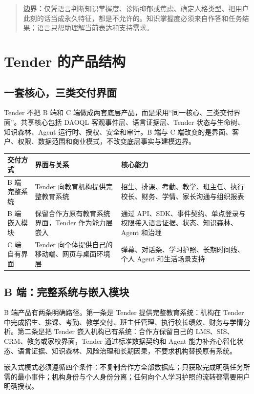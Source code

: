 \documentclass[UTF8,a4paper,11pt]{ctexart}
\newcommand{\boundary}[1]{\begin{quote}\noindent\textbf{\color{TenderPink}边界：}#1\end{quote}}
\begin{document}
\boundary{仅凭语言判断知识掌握度、诊断抑郁或焦虑、确定人格类型、把用户此刻的话当成永久特征，都是不允许的。知识掌握度必须来自作答和任务结果；语言只帮助理解当前表达和支持需求。}

\section{Tender 的产品结构}

\subsection{一套核心，三类交付界面}

Tender 不把 B 端和 C 端做成两套底层产品，而是采用“同一核心、三类交付界面”。共享核心包括 DAOQL 客观事件层、语言证据层、Tender 状态与生命树、知识森林、Agent 运行时、授权、安全和审计。B 端与 C 端改变的是界面、客户、权限、数据范围和商业模式，不改变底层事实与建模边界。

\begin{center}
\begin{longtable}{@{}p{3.0cm}p{4.6cm}p{5.2cm}@{}}
\toprule
\textbf{交付方式} & \textbf{界面与关系} & \textbf{核心能力} \\
\midrule
B 端完整系统 & Tender 向教育机构提供完整教育系统 & 招生、排课、考勤、教学、班主任、执行校长、财务、学情、家长沟通与组织报表 \\
B 端嵌入模块 & 保留合作方原有教育系统界面，Tender 作为能力层嵌入 & 通过 API、SDK、事件契约、单点登录与权限接入语言证据、状态、知识森林、Agent 和治理 \\
C 端自有界面 & Tender 向个体提供自己的移动端、网页与桌面环境层 & 弹幕、对话条、学习护照、长期时间线、个人 Agent 和生活场景支持 \\
\bottomrule
\end{longtable}
\end{center}

\subsection{B 端：完整系统与嵌入模块}

B 端产品有两条明确路径。第一条是 Tender 提供完整教育系统：机构在 Tender 中完成招生、排课、考勤、教学交付、班主任管理、执行校长绩效、财务与学情分析。第二条是把 Tender 嵌入机构已有系统：合作方保留自己的 LMS、SIS、CRM、教务或家校界面，Tender 通过标准数据契约和 Agent 能力补齐心智化状态、语言证据、知识森林、风险治理和长期因果，不要求机构替换原有系统。

嵌入式模式必须遵循四个条件：不复制合作方全部数据库；只获取完成明确任务所需的最小事件；机构身份与个人身份分离；任何向个人学习护照的流转都需要用户明确授权。
\end{document}
